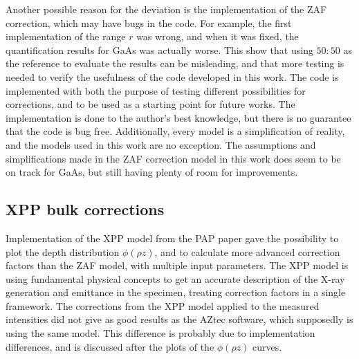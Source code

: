 Another possible reason for the deviation is the implementation of the ZAF correction, which may have bugs in the code.
For example, the first implementation of the range $r$ was wrong, and when it was fixed, the quantification results for GaAs was actually worse.
This show that using $50:50$ as the reference to evaluate the results can be misleading, and that more testing is needed to verify the usefulness of the code developed in this work.
The code is implemented with both the purpose of testing different possibilities for corrections, and to be used as a starting point for future works.
The implementation is done to the author's best knowledge, but there is no guarantee that the code is bug free.
Additionally, every model is a simplification of reality, and the models used in this work are no exception.
The assumptions and simplifications made in the ZAF correction model in this work does seem to be on track for GaAs, but still having plenty of room for improvements.





\subsection{XPP bulk corrections}
\label{discussion:quantitative:xpp}

Implementation of the XPP model from the PAP paper \cite{pap_1991} gave the possibility to plot the depth distribution $\phi(\rho z)$, and to calculate more advanced correction factors than the ZAF model, with multiple input parameters.
The XPP model is using fundamental physical concepts to get an accurate description of the X-ray generation and emittance in the specimen, treating correction factors in a single framework.
The corrections from the XPP model applied to the measured intensities did not give as good results as the AZtec software, which supposedly is using the same model.
This difference is probably due to implementation differences, and is discussed after the plots of the $\phi(\rho z)$ curves.

